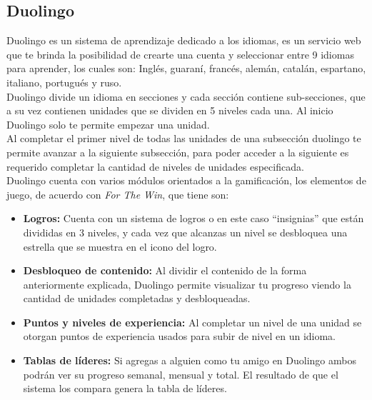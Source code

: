 \begin{multicols*}{2}
\subsection*{Duolingo}

 Duolingo \cite{PagDuolingo} es un sistema de aprendizaje dedicado a los idiomas, es un servicio web que
 te brinda la posibilidad de crearte una cuenta y seleccionar entre 9 idiomas para aprender,
 los cuales son: Inglés, guaraní, francés, alemán, catalán, espartano, italiano, portugués y ruso.\\

 \noindent Duolingo divide un idioma en secciones y cada sección contiene sub-secciones,
 que a su vez contienen unidades que se dividen en 5 niveles cada una. Al inicio Duolingo
 solo te permite empezar una unidad.\\

 \noindent Al completar el primer nivel de todas las unidades de una subsección duolingo
 te permite avanzar a la siguiente subsección, para poder acceder a la siguiente es requerido
 completar la cantidad de niveles de unidades especificada.\\

 \noindent Duolingo cuenta con varios módulos orientados a la gamificación, los elementos
 de juego, de acuerdo con {\em For The Win}, que tiene son:

    \begin{itemize}
    \item {\bf Logros:} Cuenta con un sistema de logros o en este caso ``insignias''
        que están divididas en 3 niveles, y cada vez que alcanzas un nivel se
        desbloquea una estrella que se muestra en el icono del logro.

    \item {\bf Desbloqueo de contenido:} Al dividir el contenido de la forma
        anteriormente explicada, Duolingo permite visualizar tu progreso viendo
        la cantidad de unidades completadas y desbloqueadas.

    \item {\bf Puntos y niveles de experiencia:} Al completar un nivel de una unidad
        se otorgan puntos de experiencia usados para subir de nivel en un idioma.

    \item {\bf Tablas de líderes:} Si agregas a alguien como tu amigo en Duolingo ambos
        podrán ver su progreso semanal, mensual y total. El resultado de que el sistema
         los compara genera la tabla de líderes.


\end{itemize}
\end{multicols*}
